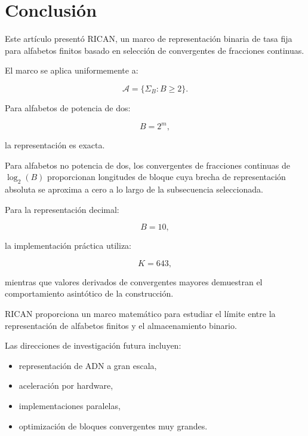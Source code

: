 \documentclass[onecolumn]{IEEEtran}
\begin{document}
\section{Conclusión}

Este artículo presentó RICAN, un marco de representación binaria de
tasa fija para alfabetos finitos basado en selección de convergentes
de fracciones continuas.

El marco se aplica uniformemente a:

\[
\mathcal{A}
=
\{\Sigma_B:B\geq2\}.
\]

Para alfabetos de potencia de dos:

\[
B=2^m,
\]

la representación es exacta.

Para alfabetos no potencia de dos, los convergentes de fracciones
continuas de $\log_2(B)$ proporcionan longitudes de bloque cuya
brecha de representación absoluta se aproxima a cero a lo largo de la
subsecuencia seleccionada.

Para la representación decimal:

\[
B=10,
\]

la implementación práctica utiliza:

\[
K=643,
\]

mientras que valores derivados de convergentes mayores demuestran el
comportamiento asintótico de la construcción.

RICAN proporciona un marco matemático para estudiar el límite entre
la representación de alfabetos finitos y el almacenamiento binario.

Las direcciones de investigación futura incluyen:

\begin{itemize}

\item representación de ADN a gran escala,

\item aceleración por hardware,

\item implementaciones paralelas,

\item optimización de bloques convergentes muy grandes.

\end{itemize}

\end{document}
